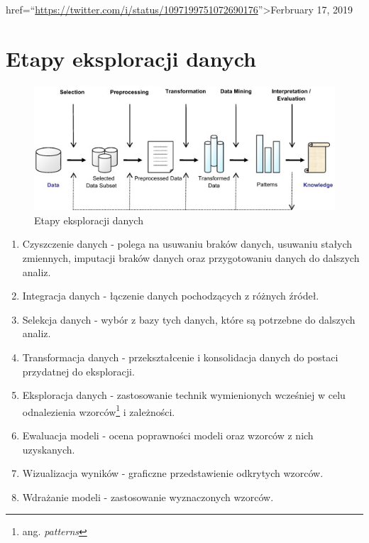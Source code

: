 \documentclass[]{book}
\providecommand{\tightlist}{%
  \setlength{\itemsep}{0pt}\setlength{\parskip}{0pt}}
\let\rmarkdownfootnote\footnote%
\def\footnote{\protect\rmarkdownfootnote}
\theoremstyle{plain}
\theoremstyle{definition}
\begin{document}
href=``\url{https://twitter.com/i/status/1097199751072690176}''\textgreater{}Ferbruary 17, 2019

\hypertarget{etapy-eksploracji-danych}{%
\section*{Etapy eksploracji danych}\label{etapy-eksploracji-danych}}

\begin{figure}
\centering
\includegraphics{images/dm_stages.jpg}
\caption{\label{fig:unnamed-chunk-2}Etapy eksploracji danych \citep{KAVAKIOTIS2017}}
\end{figure}

\begin{enumerate}
\def\labelenumi{\arabic{enumi}.}
\tightlist
\item
  Czyszczenie danych - polega na usuwaniu braków danych, usuwaniu stałych zmiennych, imputacji braków danych oraz przygotowaniu danych do dalszych analiz.
\item
  Integracja danych - łączenie danych pochodzących z różnych źródeł.
\item
  Selekcja danych - wybór z bazy tych danych, które są potrzebne do dalszych analiz.
\item
  Transformacja danych - przekształcenie i konsolidacja danych do postaci przydatnej do eksploracji.
\item
  Eksploracja danych - zastosowanie technik wymienionych wcześniej w celu odnalezienia wzorców\footnote{ang. \emph{patterns}} i zależności.
\item
  Ewaluacja modeli - ocena poprawności modeli oraz wzorców z nich uzyskanych.
\item
  Wizualizacja wyników - graficzne przedstawienie odkrytych wzorców.
\item
  Wdrażanie modeli - zastosowanie wyznaczonych wzorców.
\end{enumerate}
\end{document}
